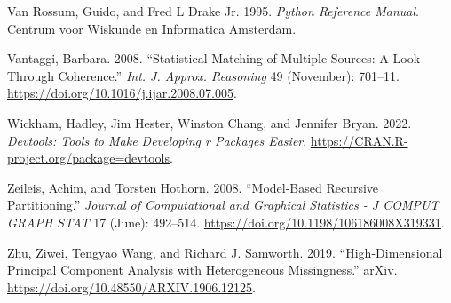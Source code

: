 \begin{CSLReferences}{1}{0}
\leavevmode{}%
Van Rossum, Guido, and Fred L Drake Jr. 1995. \emph{Python Reference Manual}. Centrum voor Wiskunde en Informatica Amsterdam.

\leavevmode{}%
Vantaggi, Barbara. 2008. {``Statistical Matching of Multiple Sources: A Look Through Coherence.''} \emph{Int. J. Approx. Reasoning} 49 (November): 701--11. \url{https://doi.org/10.1016/j.ijar.2008.07.005}.

\leavevmode{}%
Wickham, Hadley, Jim Hester, Winston Chang, and Jennifer Bryan. 2022. \emph{Devtools: Tools to Make Developing r Packages Easier}. \url{https://CRAN.R-project.org/package=devtools}.

\leavevmode{}%
Zeileis, Achim, and Torsten Hothorn. 2008. {``Model-Based Recursive Partitioning.''} \emph{Journal of Computational and Graphical Statistics - J COMPUT GRAPH STAT} 17 (June): 492--514. \url{https://doi.org/10.1198/106186008X319331}.

\leavevmode{}%
Zhu, Ziwei, Tengyao Wang, and Richard J. Samworth. 2019. {``High-Dimensional Principal Component Analysis with Heterogeneous Missingness.''} arXiv. \url{https://doi.org/10.48550/ARXIV.1906.12125}.

\end{CSLReferences}



\address{%
Gregory Guernec\\
INSERM, CERPOP, UMR 1295\\%
Université de Toulouse, INSERM, UPS\\ Toulouse, France\\
%
%
\textit{ORCiD: \href{https://orcid.org/0000-0002-0668-8606}{0000-0002-0668-8606}}\\%
\href{mailto:gregory.guernec@inserm.fr}{\nolinkurl{gregory.guernec@inserm.fr}}%
}

\address{%
Valerie Gares\\
CNRS, IRMAR, UMR 6625\\%
INSA, Université de Rennes\\ Rennes, France\\
%
\url{http://vgares.perso.math.cnrs.fr/contact.html}\\%
%
\href{mailto:valerie.gares@insa-rennes.fr}{\nolinkurl{valerie.gares@insa-rennes.fr}}%
}

